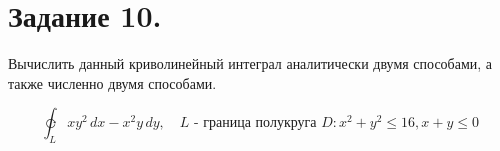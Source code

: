 \newpage
\section{Задание 10.}

Вычислить данный криволинейный интеграл аналитически двумя способами, а также численно двумя способами.

$$\varointclockwise_L xy^2 \,dx - x^2y \,dy, \quad L \text{ - граница полукруга } D: x^2 + y^2 \leq 16, x + y \leq 0$$


\newpage





